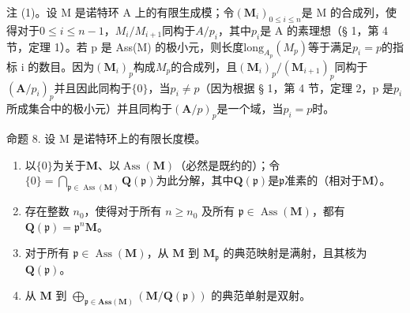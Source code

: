 注 (1)。设 M 是诺特环 A 上的有限生成模；令\((\mathbf{M}_{i})_{0\leqslant i\leqslant n}\)是 M 的合成列，使得对于\(0\leqslant i\leqslant n-1\)，\(M_{i}/M_{i+1}\)同构于\(A/p_{i}\)，其中\(p_{i}\)是 A 的素理想（§ 1，第 4 节，定理 1）。若 p 是 Ass(M) 的极小元，则长度\(\text{long}_{A_{p}}(M_{p})\)等于满足\(p_{i}=p\)的指标 i 的数目。因为\((\mathbf{M}_{i})_{p}\)构成\(M_{p}\)的合成列，且\((\mathbf{M}_{i})_{p}/(\mathbf{M}_{i+1})_{p}\)同构于\((\mathbf{A}/p_{i})_{p}\)并且因此同构于\(\{0\}\)，当\(p_{i}\neq p\)（因为根据 § 1，第 4 节，定理 2，p 是\(p_{i}\)所成集合中的极小元）并且同构于\((\mathbf{A}/p)_{p}\)是一个域，当\(p_{i}=p\)时。

命题 8. 设 M 是诺特环上的有限长度模。

\begin{enumerate}
\def\labelenumi{(\roman{enumi})}
\item
  以\(\{0\}\)为关于\(\mathbf{M}\)、以\(\operatorname{Ass}(\mathbf{M})\)（必然是既约的）；令\(\{0\} = \bigcap_{\mathfrak{p} \in \operatorname{Ass}(\mathbf{M})} \mathbf{Q}(\mathfrak{p})\)为此分解，其中\(\mathbf{Q}(\mathfrak{p})\)是\(\mathfrak{p}\)准素的（相对于\(\mathbf{M}\)）。
\item
  存在整数 \(n_0\)，使得对于所有 \(n \geqslant n_0\) 及所有 \(\mathfrak{p} \in \operatorname{Ass}(\mathbf{M})\)，都有 \(\mathbf{Q}(\mathfrak{p}) = \mathfrak{p}^n\mathbf{M}\)。
\item
  对于所有 \(\mathfrak{p} \in \operatorname{Ass}(\mathbf{M})\)，从 \(\mathbf{M}\) 到 \(\mathbf{M}_{\mathfrak{p}}\) 的典范映射是满射，且其核为 \(\mathbf{Q}(\mathfrak{p})\)。
\item
  从 \(\mathbf{M}\) 到 \(\bigoplus_{\mathfrak{p} \in \mathbf{Ass}(\mathbf{M})} (\mathbf{M} / \mathbf{Q}(\mathfrak{p}))\) 的典范单射是双射。
\end{enumerate}

